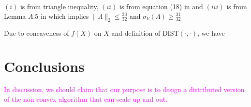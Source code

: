 \documentclass[letterpaper]{article} %
\begin{document}
$(i)$ is from triangle inequality, $(ii)$ is from equation (18) in \cite{park2016finding} and $(iii)$ is from Lemma $A.5$ in \cite{park2016finding} which implies $\|\Lambda\|_2\le \frac{33}{32}$ and $\sigma_V(\Lambda)\ge \frac{31}{32}$

Due to concaveness of $f(X)$ on $X$ and definition of $\text{DIST}(\cdot,\cdot)$, we have 

\section{Conclusions}
\textcolor{magenta}{In discussion, we should claim that our purpose is to design a distributed version of the non-convex algorithm that can scale up and out.}
 


\end{document}
